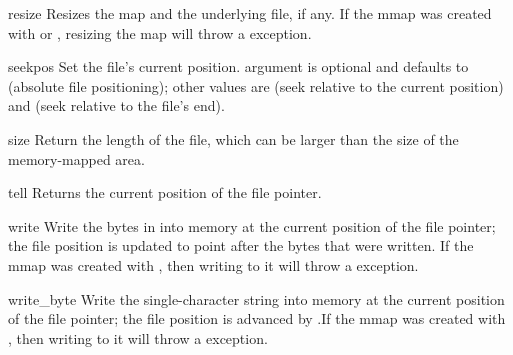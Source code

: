 \begin{methoddesc}{resize}{}
  Resizes the map and the underlying file, if any.
  If the mmap was created with  or
  , resizing the map will throw a  exception.
\end{methoddesc}

\begin{methoddesc}{seek}{pos}
  Set the file's current position.   argument is optional
  and defaults to  (absolute file positioning); other values
  are  (seek relative to the current position) and 
  (seek relative to the file's end).
\end{methoddesc}

\begin{methoddesc}{size}{}
  Return the length of the file, which can be larger than the size of
  the memory-mapped area.
\end{methoddesc}

\begin{methoddesc}{tell}{}
  Returns the current position of the file pointer.
\end{methoddesc}

\begin{methoddesc}{write}{}
  Write the bytes in  into memory at the current position
  of the file pointer; the file position is updated to point after the
  bytes that were written. If the mmap was created with
  , then writing to it will throw a
   exception.
\end{methoddesc}

\begin{methoddesc}{write_byte}{}
  Write the single-character string  into memory at the
  current position of the file pointer; the file position is advanced
  by .If the mmap was created with ,
  then writing to it will throw a  exception.
\end{methoddesc}
